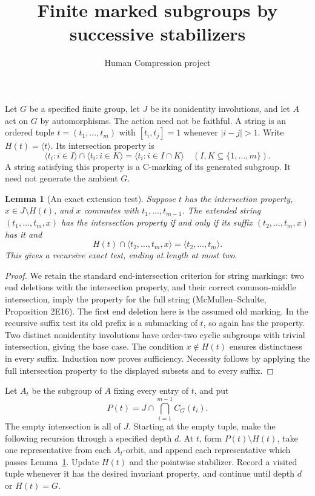 \documentclass[11pt,a4paper]{article}
\title{Finite marked subgroups by successive stabilizers}
\author{Human Compression project}\date{}
\newtheorem{lemma}{Lemma}\newtheorem{theorem}[lemma]{Theorem}
\newcommand{\gen}[1]{\langle#1\rangle}
\begin{document}
\maketitle
Let $G$ be a specified finite group, let $J$ be its nonidentity
involutions, and let $A$ act on $G$ by automorphisms. The action need
not be faithful. A string is an ordered tuple $t=(t_1,\ldots,t_m)$
with $[t_i,t_j]=1$ whenever $|i-j|>1$. Write $H(t)=\gen t$.
Its intersection property is
\[
 \gen{t_i:i\in I}\cap\gen{t_i:i\in K}
       =\gen{t_i:i\in I\cap K}\quad(I,K\subseteq\{1,\ldots,m\}).
\]
A string satisfying this property is a C-marking of its generated
subgroup. It need not generate the ambient $G$.

\begin{lemma}[An exact extension test]\label{ip}
Suppose $t$ has the intersection property, $x\in J\setminus H(t)$,
and $x$ commutes with $t_1,\ldots,t_{m-1}$. The extended string
$(t_1,\ldots,t_m,x)$ has the intersection property if and only if
its suffix $(t_2,\ldots,t_m,x)$ has it and
\[
 H(t)\cap\gen{t_2,\ldots,t_m,x}=\gen{t_2,\ldots,t_m}.
\]
This gives a recursive exact test, ending at length at most two.
\end{lemma}
\begin{proof}
We retain the standard end-intersection criterion for string
markings: two end deletions with the intersection property, and
their correct common-middle intersection, imply the property for
the full string (McMullen--Schulte, Proposition 2E16).
The first end deletion here is the assumed old marking. In the
recursive suffix test its old prefix is a submarking of $t$, so
again has the property. Two distinct nonidentity involutions have
order-two cyclic subgroups with trivial intersection, giving the
base case. The condition $x\notin H(t)$ ensures distinctness in
every suffix. Induction now proves sufficiency. Necessity follows
by applying the full intersection property to the displayed
subsets and to every suffix.
\end{proof}

Let $A_t$ be the subgroup of $A$ fixing every entry of $t$, and put
\[
 P(t)=J\cap\bigcap_{i=1}^{m-1}C_G(t_i).
\]
The empty intersection is all of $J$. Starting at the empty tuple,
make the following recursion through a specified depth $d$.
At $t$, form $P(t)\setminus H(t)$, take one representative from
each $A_t$-orbit, and append each representative which passes
Lemma~\ref{ip}. Update $H(t)$ and the pointwise stabilizer.
Record a visited tuple whenever it has the desired invariant
property, and continue until depth $d$ or $H(t)=G$.
\end{document}
